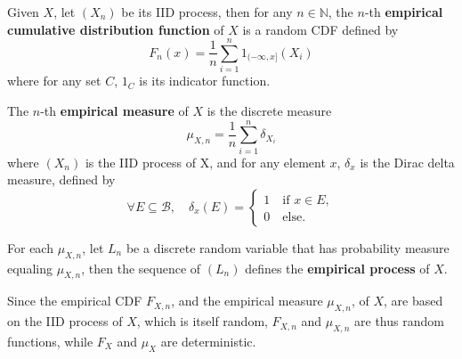 \begin{defn}
Given $X$, let $(X_n)$ be its IID process, then for any $n\in \mathbb{N}$, the $n$-th \textbf{empirical cumulative distribution function} of $X$ is a random CDF defined by
\begin{equation}
F_{n}(x)={\frac {1}{n}}\sum _{i=1}^{n}1_{(-\infty ,x]}(X_{i})
\label{eq:empirical_CDF}
\end{equation}
where for any set $C$, $1_C$ is its indicator function. 
\end{defn}

\begin{defn}
\label{defn:empirical_process}
The $n$-th \textbf{empirical measure} of $X$ is the discrete measure
\begin{equation}
\mu_{X, n} = {\frac {1}{n}}\sum _{i=1}^{n}\delta_{X_i}
\label{eq:empirical_measure}
\end{equation}
where $(X_n)$ is the IID process of X, and for any element $x$, $\delta_x$ is the Dirac delta measure, defined by 
\begin{equation*}
\forall E\subseteq \mathcal{B}, 
\quad
\delta_x(E) = \begin{cases}
1 \quad \text{if } x\in E,\\
0 \quad \text{else.}
\end{cases}
\end{equation*}

For each $\mu_{X, n}$, let $L_n$ be a discrete random variable that has probability measure equaling $\mu_{X, n}$, then the sequence of $(L_n)$ defines the \textbf{empirical process} of $X$.
\end{defn}

\begin{remark}
Since the empirical CDF $F_{X, n}$, and the empirical measure $\mu_{X, n}$, of $X$, are based on the IID process of $X$, which is itself random, $F_{X, n}$ and $\mu_{X, n}$ are thus random functions, while $F_X$ and $\mu_X$ are deterministic.
\end{remark}

